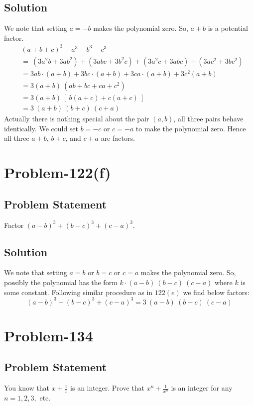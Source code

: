 \documentclass[12pt]{article}
\begin{document}
\subsection*{Solution}
We note that setting $a=-b$ makes the polynomial zero. So, $a+b$ is a potential factor.
\begin{equation*}
	\begin{aligned}
		& (a+b+c)^3 -a^3-b^3-c^3\\
		&=\ \left( 3a^2b+3ab^2 \right) + \left( 3abc+3b^2c \right) + \left( 3a^2c+3abc \right) + \left( 3ac^2 + 3bc^2 \right)\\
		&= 3ab\cdot (a+b) + 3bc\cdot (a+b) + 3ca\cdot (a+b) + 3c^2(a+b)\\
		&= 3(a+b)\ \left(ab+bc+ca+c^2\right)\\
		&= 3(a+b)\ [\ b(a+c)+c(a+c)\ ]\\
		&= 3\ (a+b)\ (b+c)\ (c+a)
	\end{aligned}
\end{equation*}
Actually there is nothing special about the pair $(a,b)$, all three pairs behave identically. We could set $b=-c$ or $c=-a$ to make the polynomial zero. Hence all three $a+b$, $b+c$, and $c+a$ are factors.

\section*{Problem-122(f)}
\subsection*{Problem Statement}
Factor $(a-b)^3 + (b-c)^3 + (c-a)^3$.
\subsection*{Solution}
We note that setting $a=b$ or $b=c$ or $c=a$ makes the polynomial zero. So, possibly the polynomial has the form $k\cdot (a-b)\ (b-c)\ (c-a)$ where $k$ is some constant. Following similar procedure as in $122(e)$ we find below factors:
\[
	(a-b)^3 + (b-c)^3 + (c-a)^3 = 3\ (a-b)\ (b-c)\ (c-a)
\]

\section*{Problem-134}
\subsection*{Problem Statement}
You know that $x + \frac{1}{x}$ is an integer. Prove that $x^n + \frac{1}{x^n}$ is an integer for any $n=1,2,3,$ etc.
\end{document}
